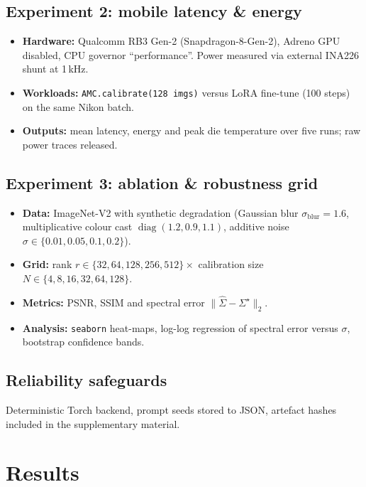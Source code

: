 \documentclass{article} %
\begin{document}
\subsection{Experiment 2: mobile latency \& energy}
\begin{itemize}
  \item\textbf{Hardware:} Qualcomm RB3 Gen-2 (Snapdragon-8-Gen-2), Adreno GPU disabled, CPU governor ``performance''. Power measured via external INA226 shunt at 1\,kHz.
  \item\textbf{Workloads:} \texttt{AMC.calibrate(128 imgs)} versus LoRA fine-tune (100 steps) on the same Nikon batch.
  \item\textbf{Outputs:} mean latency, energy and peak die temperature over five runs; raw power traces released.
\end{itemize}

\subsection{Experiment 3: ablation \& robustness grid}
\begin{itemize}
  \item\textbf{Data:} ImageNet-V2 with synthetic degradation (Gaussian blur $\sigma_{\text{blur}}=1.6$, multiplicative colour cast $\operatorname{diag}(1.2,0.9,1.1)$, additive noise $\sigma\in\{0.01,0.05,0.1,0.2\}$).
  \item\textbf{Grid:} rank $r\in\{32,64,128,256,512\}\times$ calibration size $N\in\{4,8,16,32,64,128\}$.
  \item\textbf{Metrics:} PSNR, SSIM and spectral error $\lVert\hat\Sigma-\Sigma^{\star}\rVert_{2}$.
  \item\textbf{Analysis:} \texttt{seaborn} heat-maps, log-log regression of spectral error versus $\sigma$, bootstrap confidence bands.
\end{itemize}

\subsection{Reliability safeguards}
Deterministic Torch backend, prompt seeds stored to JSON, artefact hashes included in the supplementary material.

\section{Results}
\label{sec:results}
\end{document}
